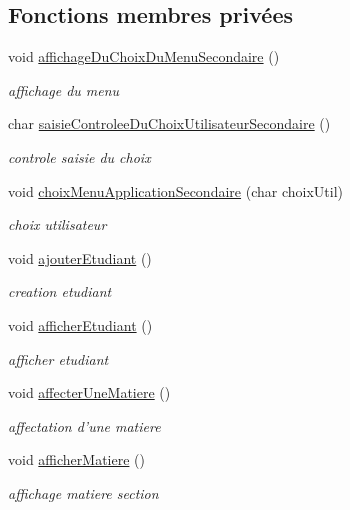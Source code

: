 \subsection*{Fonctions membres privées}
\begin{DoxyCompactItemize}
\item 
void \hyperlink{class_section_a648fe297e7ba1d421517edfd50114bba}{affichage\+Du\+Choix\+Du\+Menu\+Secondaire} ()
\begin{DoxyCompactList}\small\item\em affichage du menu \end{DoxyCompactList}\item 
char \hyperlink{class_section_a1cfe7f586b0aa72fbdb4c66e3e760328}{saisie\+Controlee\+Du\+Choix\+Utilisateur\+Secondaire} ()
\begin{DoxyCompactList}\small\item\em controle saisie du choix \end{DoxyCompactList}\item 
void \hyperlink{class_section_a18d873239d981624af69451f4e804543}{choix\+Menu\+Application\+Secondaire} (char choix\+Util)
\begin{DoxyCompactList}\small\item\em choix utilisateur \end{DoxyCompactList}\item 
void \hyperlink{class_section_aca817449026803dfddfe01fb76b2a4d6}{ajouter\+Etudiant} ()
\begin{DoxyCompactList}\small\item\em creation etudiant \end{DoxyCompactList}\item 
void \hyperlink{class_section_a762dcfde40a8821f21324d1ade96999b}{afficher\+Etudiant} ()
\begin{DoxyCompactList}\small\item\em afficher etudiant \end{DoxyCompactList}\item 
void \hyperlink{class_section_a1c211fc04d2670f4d06623b3484e1456}{affecter\+Une\+Matiere} ()
\begin{DoxyCompactList}\small\item\em affectation d'une matiere \end{DoxyCompactList}\item 
void \hyperlink{class_section_a1debe78679287f470ce2ae2f8c5fd26d}{afficher\+Matiere} ()
\begin{DoxyCompactList}\small\item\em affichage matiere section \end{DoxyCompactList}\item 

\end{DoxyCompactItemize}
